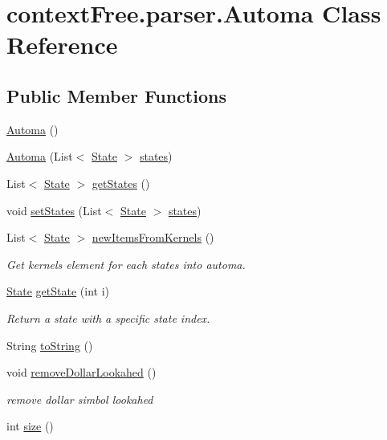 \hypertarget{classcontext_free_1_1parser_1_1_automa}{\section{context\-Free.\-parser.\-Automa Class Reference}
\label{classcontext_free_1_1parser_1_1_automa}
}
\subsection*{Public Member Functions}
\begin{DoxyCompactItemize}
\item 
\hyperlink{classcontext_free_1_1parser_1_1_automa_a6163f4f4b71c0bbd11cb883c7a3265a6}{Automa} ()
\item 
\hyperlink{classcontext_free_1_1parser_1_1_automa_a6a030d3a01bf7ef99b437fcf14727bad}{Automa} (List$<$ \hyperlink{classcontext_free_1_1parser_1_1_state}{State} $>$ \hyperlink{classcontext_free_1_1parser_1_1_automa_a5b71afafd71dfa903e36c786618b556d}{states})
\item 
List$<$ \hyperlink{classcontext_free_1_1parser_1_1_state}{State} $>$ \hyperlink{classcontext_free_1_1parser_1_1_automa_a0a2be97fe40e3035c579b83535649c2e}{get\-States} ()
\item 
void \hyperlink{classcontext_free_1_1parser_1_1_automa_a16f74867e919ccddf13441295c80295b}{set\-States} (List$<$ \hyperlink{classcontext_free_1_1parser_1_1_state}{State} $>$ \hyperlink{classcontext_free_1_1parser_1_1_automa_a5b71afafd71dfa903e36c786618b556d}{states})
\item 
List$<$ \hyperlink{classcontext_free_1_1parser_1_1_state}{State} $>$ \hyperlink{classcontext_free_1_1parser_1_1_automa_ad82cfb3bb6b22d084ef18a95350828b3}{new\-Items\-From\-Kernels} ()
\begin{DoxyCompactList}\small\item\em Get kernels element for each states into automa. \end{DoxyCompactList}\item 
\hyperlink{classcontext_free_1_1parser_1_1_state}{State} \hyperlink{classcontext_free_1_1parser_1_1_automa_a08b46ef04492599b98660a5e55f356bd}{get\-State} (int i)
\begin{DoxyCompactList}\small\item\em Return a state with a specific state index. \end{DoxyCompactList}\item 
String \hyperlink{classcontext_free_1_1parser_1_1_automa_a816d25575a45d9a0bbc415a6e0a71a2e}{to\-String} ()
\item 
void \hyperlink{classcontext_free_1_1parser_1_1_automa_ad94ecd3a9f8850220f86b6c54b751f78}{remove\-Dollar\-Lookahed} ()
\begin{DoxyCompactList}\small\item\em remove dollar simbol lookahed \end{DoxyCompactList}\item 
int \hyperlink{classcontext_free_1_1parser_1_1_automa_aa3e53614ea757f72b87144aa6b5b2282}{size} ()
\end{DoxyCompactItemize}
